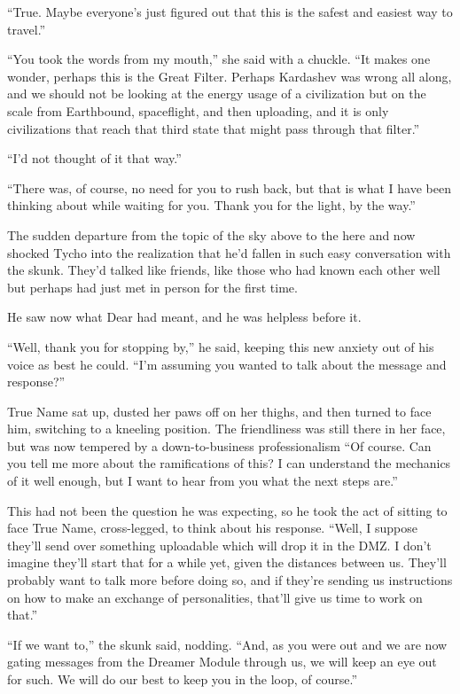 ``True. Maybe everyone's just figured out that this is the safest and easiest way to travel.''

``You took the words from my mouth,'' she said with a chuckle. ``It makes one wonder, perhaps this is the Great Filter. Perhaps Kardashev was wrong all along, and we should not be looking at the energy usage of a civilization but on the scale from Earthbound, spaceflight, and then uploading, and it is only civilizations that reach that third state that might pass through that filter.''

``I'd not thought of it that way.''

``There was, of course, no need for you to rush back, but that is what I have been thinking about while waiting for you. Thank you for the light, by the way.''

The sudden departure from the topic of the sky above to the here and now shocked Tycho into the realization that he'd fallen in such easy conversation with the skunk. They'd talked like friends, like those who had known each other well but perhaps had just met in person for the first time.

He saw now what Dear had meant, and he was helpless before it.

``Well, thank you for stopping by,'' he said, keeping this new anxiety out of his voice as best he could. ``I'm assuming you wanted to talk about the message and response?''

True Name sat up, dusted her paws off on her thighs, and then turned to face him, switching to a kneeling position. The friendliness was still there in her face, but was now tempered by a down-to-business professionalism ``Of course. Can you tell me more about the ramifications of this? I can understand the mechanics of it well enough, but I want to hear from you what the next steps are.''

This had not been the question he was expecting, so he took the act of sitting to face True Name, cross-legged, to think about his response. ``Well, I suppose they'll send over something uploadable which will drop it in the DMZ. I don't imagine they'll start that for a while yet, given the distances between us. They'll probably want to talk more before doing so, and if they're sending us instructions on how to make an exchange of personalities, that'll give us time to work on that.''

``If we want to,'' the skunk said, nodding. ``And, as you were out and we are now gating messages from the Dreamer Module through us, we will keep an eye out for such. We will do our best to keep you in the loop, of course.''

